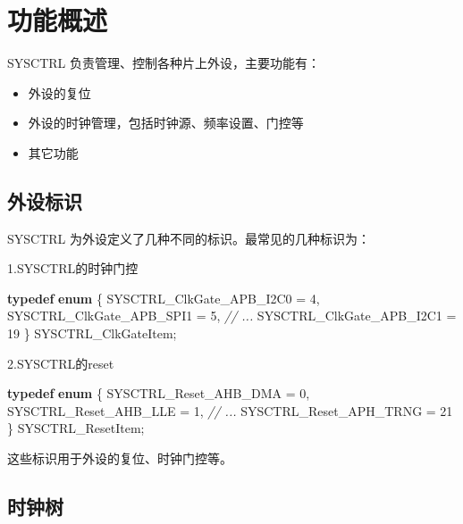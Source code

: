 \documentclass[
  12pt,
]{book}
\newenvironment{Shaded}{\begin{snugshade}}{\end{snugshade}}
\newcommand{\CommentTok}[1]{\textcolor[rgb]{0.56,0.35,0.01}{\textit{#1}}}
\newcommand{\DecValTok}[1]{\textcolor[rgb]{0.00,0.00,0.81}{#1}}
\newcommand{\KeywordTok}[1]{\textcolor[rgb]{0.13,0.29,0.53}{\textbf{#1}}}
\newcommand{\NormalTok}[1]{#1}
\providecommand{\tightlist}{%
  \setlength{\itemsep}{0pt}\setlength{\parskip}{0pt}}
\begin{document}
\hypertarget{ux529fux80fdux6982ux8ff0-3}{%
\section{功能概述}\label{ux529fux80fdux6982ux8ff0-3}}

SYSCTRL 负责管理、控制各种片上外设，主要功能有：

\begin{itemize}
\tightlist
\item
  外设的复位
\item
  外设的时钟管理，包括时钟源、频率设置、门控等
\item
  其它功能
\end{itemize}

\hypertarget{ux5916ux8bbeux6807ux8bc6}{%
\subsection{外设标识}\label{ux5916ux8bbeux6807ux8bc6}}

SYSCTRL 为外设定义了几种不同的标识。最常见的几种标识为：

1.SYSCTRL的时钟门控

\begin{Shaded}
\begin{Highlighting}[]
\KeywordTok{typedef} \KeywordTok{enum}
\NormalTok{\{}
\NormalTok{    SYSCTRL_ClkGate_APB_I2C0    = }\DecValTok{4}\NormalTok{,}
\NormalTok{    SYSCTRL_ClkGate_APB_SPI1    = }\DecValTok{5}\NormalTok{,}
    \CommentTok{// ...}
\NormalTok{    SYSCTRL_ClkGate_APB_I2C1    = }\DecValTok{19}
\NormalTok{\} SYSCTRL_ClkGateItem;}
\end{Highlighting}
\end{Shaded}

2.SYSCTRL的reset

\begin{Shaded}
\begin{Highlighting}[]
\KeywordTok{typedef} \KeywordTok{enum}
\NormalTok{\{}
\NormalTok{    SYSCTRL_Reset_AHB_DMA     = }\DecValTok{0}\NormalTok{,}
\NormalTok{    SYSCTRL_Reset_AHB_LLE     = }\DecValTok{1}\NormalTok{,}
    \CommentTok{// ...}
\NormalTok{    SYSCTRL_Reset_APH_TRNG    = }\DecValTok{21}
\NormalTok{\} SYSCTRL_ResetItem;}
\end{Highlighting}
\end{Shaded}

这些标识用于外设的复位、时钟门控等。

\hypertarget{ux65f6ux949fux6811}{%
\subsection{时钟树}\label{ux65f6ux949fux6811}}
\end{document}

